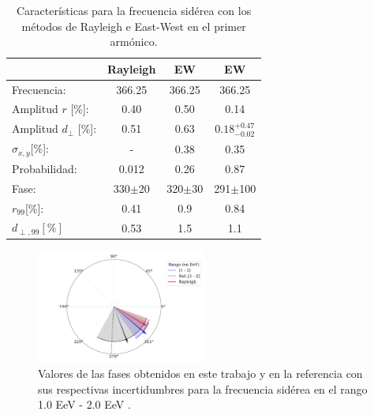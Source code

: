     \begin{table}[H]
        \begin{small}
            \begin{center}
                \begin{tabular}[c]{l|c||c|c}
                                            & Rayleigh      & EW            & EW\cite{Aab_2020}      \\\hline
                    Frecuencia:             & 366.25	    & 366.25        & 366.25        \\
                    Amplitud $r$ [\%]:      & 0.40	        & 0.50          & 0.14\footnotemark[2]      \\
                    Amplitud $d_\perp$ [\%]:& 0.51          & 0.63          & $0.18 ^{+0.47}_{-0.02}$       \\ 
                    $\sigma_{x,y}$[\%]:     & -	            & 0.38	        & 0.35          \\
                    Probabilidad:           & 0.012	        & 0.26          & 0.87          \\
                    Fase:                   & 330$\pm$20    & 320$\pm$30    & 291$\pm$100 \footnotemark[3]     \\
                    $r_{99}$[\%]:           & 0.41	        & 0.9           & 0.84\footnotemark[2]       \\
                    $d_{\perp,99}[\%]$      & 0.53          & 1.5           & 1.1        \\
                \end{tabular}
            \end{center}
        \end{small}
        \caption{Características para la frecuencia sidérea con los métodos de Rayleigh  e East-West en el primer armónico.}
        \label{tab:siderea_3}
    \end{table}
   
    \begin{figure}[H]
        \begin{small}
            \begin{center}
                \includegraphics[width=0.5\textwidth]{phase_tercer_bin.pdf}
            \end{center}
        \caption{Valores de las fases obtenidos en este trabajo y en la referencia con sus respectivas incertidumbres para la frecuencia sidérea en el  rango 1.0 EeV - 2.0 EeV .}
        \label{fig:tercer}
        \end{small}
    \end{figure}


